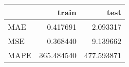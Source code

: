 \begin{tabular}{lrr}
\toprule
{} &       train &        test \\
\midrule
MAE  &    0.417691 &    2.093317 \\
MSE  &    0.368440 &    9.139662 \\
MAPE &  365.484540 &  477.593871 \\
\bottomrule
\end{tabular}
